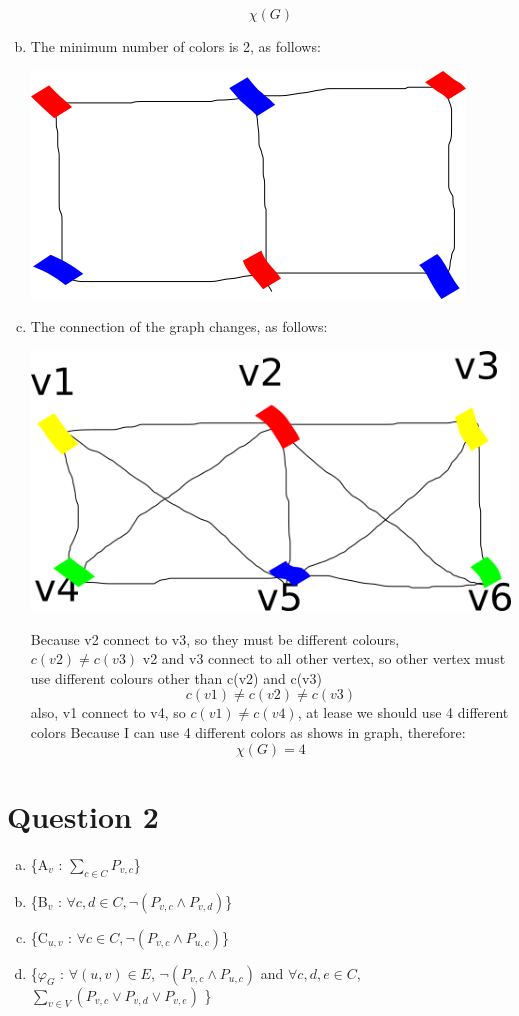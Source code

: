 \documentclass[11pt, a4paper]{article}
\begin{document}
\begin{enumerate}[(a)]
    $$ \chi(G) $$
    \item
    The minimum number of colors is 2, as follows:
    \begin{center}
        \includegraphics[scale=0.7]{q1b1}
    \end{center}
    \item
    The connection of the graph changes, as follows:
    \begin{center}
        \includegraphics[scale=0.7]{q1c1}
    \end{center}
    Because v2 connect to v3, so they must be different colours, $c(v2) \ne c(v3)$
    v2 and v3 connect to all other vertex, so other vertex must use different colours other than c(v2) and c(v3)
    $$c(v1) \ne c(v2) \ne c(v3)$$
    also, v1 connect to v4, so $c(v1) \ne c(v4)$, at lease we should use 4 different colors
    Because I can use 4 different colors as shows in graph, therefore:
    $$ \chi(G) = 4 $$
\end{enumerate}

\section*{Question 2}
\begin{enumerate}[(a)]
    \item
    \{A$_v$ :  $ \sum_{c \in C} P_{v, c}$\}
    \item
    \{B$_v$ :  $ \forall c,d \in C, \neg (P_{v, c} \land P_{v, d})$\}
    \item
    \{C$_{u, v}$ :  $ \forall c \in C, \neg (P_{v, c} \land P_{u, c})$\}
    \item
    \{$\varphi_G$ :  $ \forall (u,v) \in E $, $\neg (P_{v, c} \land P_{u, c})$ and $ \forall c,d,e \in C$, $\sum_{v \in V}(P_{v, c} \lor P_{v, d} \lor P_{v, e})$ \}
\end{enumerate}
\end{document}

